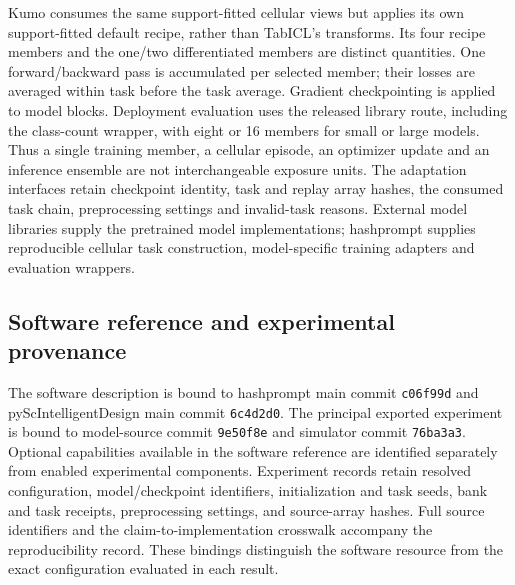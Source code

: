 Kumo consumes the same support-fitted cellular views but applies its own support-fitted default recipe, rather than TabICL's transforms. Its four recipe members and the one/two differentiated members are distinct quantities. One forward/backward pass is accumulated per selected member; their losses are averaged within task before the task average. Gradient checkpointing is applied to model blocks. Deployment evaluation uses the released library route, including the class-count wrapper, with eight or 16 members for small or large models. Thus a single training member, a cellular episode, an optimizer update and an inference ensemble are not interchangeable exposure units. The adaptation interfaces retain checkpoint identity, task and replay array hashes, the consumed task chain, preprocessing settings and invalid-task reasons. External model libraries supply the pretrained model implementations; hashprompt supplies reproducible cellular task construction, model-specific training adapters and evaluation wrappers.

\subsection*{Software reference and experimental provenance}
The software description is bound to hashprompt main commit \texttt{c06f99d} and pyScIntelligentDesign main commit \texttt{6c4d2d0}. The principal exported experiment is bound to model-source commit \texttt{9e50f8e} and simulator commit \texttt{76ba3a3}. Optional capabilities available in the software reference are identified separately from enabled experimental components. Experiment records retain resolved configuration, model/checkpoint identifiers, initialization and task seeds, bank and task receipts, preprocessing settings, and source-array hashes. Full source identifiers and the claim-to-implementation crosswalk accompany the reproducibility record. These bindings distinguish the software resource from the exact configuration evaluated in each result.
